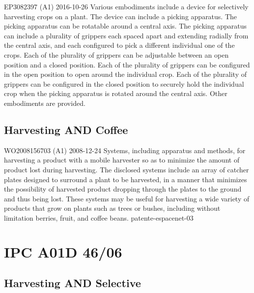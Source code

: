 {EP3082397 (A1)}%
{2016-10-26}%
{Various embodiments include a device for selectively harvesting crops on a
  plant. The device can include a picking apparatus.  The picking apparatus can
  be rotatable around a central axis. The picking apparatus can include a
  plurality of grippers each spaced apart and extending radially from the
  central axis, and each configured to pick a different individual one of the
  crops. Each of the plurality of grippers can be adjustable between an open
  position and a closed position. Each of the plurality of grippers can be
  configured in the open position to open around the individual crop. Each of
  the plurality of grippers can be configured in the closed position to securely
  hold the individual crop when the picking apparatus is rotated around the
  central axis. Other embodiments are provided.}%
{}%


\subsection{Harvesting AND Coffee}
\label{sec:harvesting-coffee}

{WO2008156703 (A1)}%
{2008-12-24}%
{Systems, including apparatus and methods, for harvesting a
product with a mobile harvester so as to minimize the amount of product
lost during harvesting. The disclosed systems include an array of catcher
plates designed to surround a plant to be harvested, in a manner that
minimizes the possibility of harvested product dropping through the plates
to the ground and thus being lost. These systems may be useful for
harvesting a wide variety of products that grow on plants such as trees or
bushes, including without limitation berries, fruit, and coffee beans.}%
{patente-espacenet-03}%


\section{IPC A01D 46/06}
\label{sec:ipc-a01d-4606-1}


\subsection{Harvesting AND Selective}
\label{sec:harvesting-selective-1}


